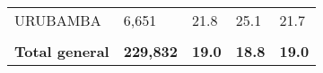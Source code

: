 \begin{tabular}{lllll}
	\cellcolor[HTML]{FF5050}URUBAMBA                               & 6,651                                                                 & 21.8                                                                             & 25.1                                                                        & 21.7                                                                                \\
	&                                                                       &                                                                                  &                                                                             &                                                                                     \\
	\rowcolor[HTML]{DDEBF7} 
	\textbf{Total   general}                                       & \textbf{229,832}                                                      & \textbf{19.0}                                                                    & \textbf{18.8}                                                               & \textbf{19.0}                                                                      
\end{tabular}